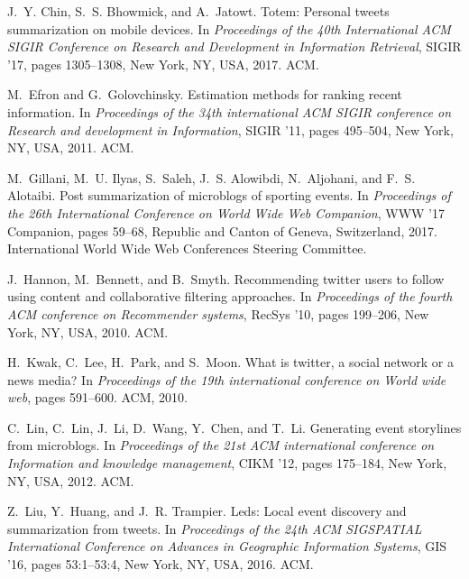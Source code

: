 \documentclass[envcountsame]{llncs}
\begin{document}
\begin{thebibliography}{10}

J.~Y. Chin, S.~S. Bhowmick, and A.~Jatowt.
\newblock Totem: Personal tweets summarization on mobile devices.
\newblock In {\em Proceedings of the 40th International ACM SIGIR Conference on
  Research and Development in Information Retrieval}, SIGIR '17, pages
  1305--1308, New York, NY, USA, 2017. ACM.

M.~Efron and G.~Golovchinsky.
\newblock Estimation methods for ranking recent information.
\newblock In {\em Proceedings of the 34th international ACM SIGIR conference on
  Research and development in Information}, SIGIR '11, pages 495--504, New
  York, NY, USA, 2011. ACM.

M.~Gillani, M.~U. Ilyas, S.~Saleh, J.~S. Alowibdi, N.~Aljohani, and F.~S.
  Alotaibi.
\newblock Post summarization of microblogs of sporting events.
\newblock In {\em Proceedings of the 26th International Conference on World
  Wide Web Companion}, WWW '17 Companion, pages 59--68, Republic and Canton of
  Geneva, Switzerland, 2017. International World Wide Web Conferences Steering
  Committee.

J.~Hannon, M.~Bennett, and B.~Smyth.
\newblock Recommending twitter users to follow using content and collaborative
  filtering approaches.
\newblock In {\em Proceedings of the fourth ACM conference on Recommender
  systems}, RecSys '10, pages 199--206, New York, NY, USA, 2010. ACM.

H.~Kwak, C.~Lee, H.~Park, and S.~Moon.
\newblock What is twitter, a social network or a news media?
\newblock In {\em Proceedings of the 19th international conference on World
  wide web}, pages 591--600. ACM, 2010.

C.~Lin, C.~Lin, J.~Li, D.~Wang, Y.~Chen, and T.~Li.
\newblock Generating event storylines from microblogs.
\newblock In {\em Proceedings of the 21st ACM international conference on
  Information and knowledge management}, CIKM '12, pages 175--184, New York,
  NY, USA, 2012. ACM.

Z.~Liu, Y.~Huang, and J.~R. Trampier.
\newblock Leds: Local event discovery and summarization from tweets.
\newblock In {\em Proceedings of the 24th ACM SIGSPATIAL International
  Conference on Advances in Geographic Information Systems}, GIS '16, pages
  53:1--53:4, New York, NY, USA, 2016. ACM.


\end{thebibliography}
\end{document}
